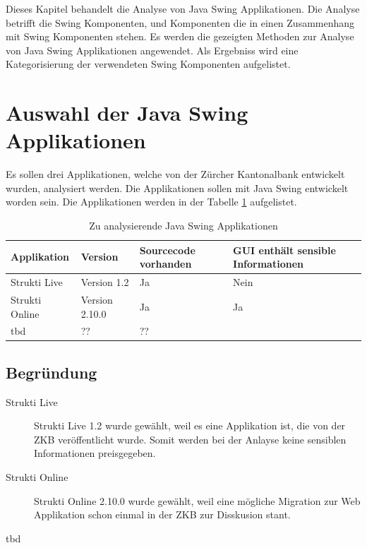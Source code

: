   Dieses Kapitel behandelt die Analyse von Java Swing Applikationen. Die
  Analyse betrifft die Swing Komponenten, und Komponenten die in einen
  Zusammenhang mit Swing Komponenten stehen. Es werden die gezeigten
  Methoden zur Analyse von Java Swing Applikationen angewendet. Als Ergebniss
  wird eine Kategorisierung der verwendeten Swing Komponenten aufgelistet.
  
  \section{Auswahl der Java Swing Applikationen}
  
  Es sollen drei Applikationen, welche von der Zürcher Kantonalbank entwickelt
  wurden, analysiert werden. Die Applikationen sollen mit Java Swing entwickelt
  worden sein. Die Applikationen werden in der Tabelle
  \ref{tab:zuAnalysierendeJavaSwingApplikationen} aufgelistet.
  \newline
  
  \begin{table}[ht]
    \sffamily 
    \begin{center}
      \begin{tabular}{llp{2cm}p{3.5cm}}
        \toprule
        Applikation & Version & Sourcecode vorhanden & GUI enthält sensible
        Informationen\\
        \midrule
        Strukti Live & Version 1.2 & Ja & Nein\\
        Strukti Online & Version 2.10.0 & Ja & Ja\\
        tbd & ?? & ??\\
        \bottomrule
      \end{tabular}
      \caption{Zu analysierende Java Swing Applikationen}
      \label{tab:zuAnalysierendeJavaSwingApplikationen}
    \end{center}
  \end{table}
  
  \subsection{Begründung}
  
  \begin{description}
  \item[Strukti Live]
  Strukti Live 1.2 wurde gewählt, weil es eine Applikation ist, die
  von der ZKB veröffentlicht wurde. Somit werden bei der Anlayse keine
  sensiblen Informationen preisgegeben.
  \item[Strukti Online]
  Strukti Online 2.10.0 wurde gewählt, weil eine mögliche Migration
  zur Web Applikation schon einmal in der \ac{ZKB} zur Disskusion stant.
  \item[tbd]
  \end{description}
  
